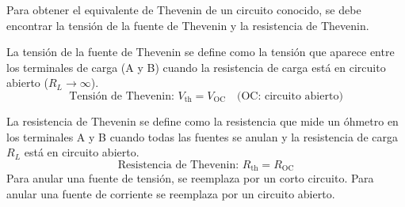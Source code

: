 Para obtener el equivalente de Thevenin de un circuito conocido, se debe encontrar la tensión de la fuente de Thevenin y la resistencia de Thevenin.

La tensión de la fuente de Thevenin se define como la tensión que aparece entre los terminales de carga (A y B) cuando la resistencia de carga está en circuito abierto (\(R_L\to\infty\)).
\[
  \text{Tensión de Thevenin: } V_\text{th}=V_\text{OC} \quad \text{(OC: circuito abierto)}
\]

La resistencia de Thevenin se define como la resistencia que mide un óhmetro en los terminales A y B cuando todas las fuentes se anulan y la resistencia de carga \(R_L\) está en circuito abierto.
\[
  \text{Resistencia de Thevenin: } R_\text{th}=R_\text{OC}
\]
Para anular una fuente de tensión, se reemplaza por un corto circuito. Para anular una fuente de corriente se reemplaza por un circuito abierto.

